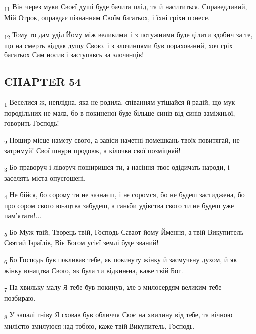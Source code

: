 \begin{tcolorbox}
\textsubscript{11} Він через муки Своєї душі буде бачити плід, та й насититься. Справедливий, Мій Отрок, оправдає пізнанням Своїм багатьох, і їхні гріхи понесе.
\end{tcolorbox}
\begin{tcolorbox}
\textsubscript{12} Тому то дам уділ Йому між великими, і з потужними буде ділити здобич за те, що на смерть віддав душу Свою, і з злочинцями був порахований, хоч гріх багатьох Сам носив і заступавсь за злочинців!
\end{tcolorbox}
\subsection{CHAPTER 54}
\begin{tcolorbox}
\textsubscript{1} Веселися ж, неплідна, яка не родила, співанням утішайся й радій, що мук породільних не мала, бо в покиненої буде більше синів від синів заміжньої, говорить Господь!
\end{tcolorbox}
\begin{tcolorbox}
\textsubscript{2} Пошир місце намету свого, а завіси наметні помешкань твоїх повитягай, не затримуй! Свої шнури продовж, а кілочки свої позміцняй!
\end{tcolorbox}
\begin{tcolorbox}
\textsubscript{3} Бо праворуч і ліворуч поширишся ти, а насіння твоє одідичать народи, і заселять міста опустошені.
\end{tcolorbox}
\begin{tcolorbox}
\textsubscript{4} Не бійся, бо сорому ти не зазнаєш, і не соромся, бо не будеш застиджена, бо про сором свого юнацтва забудеш, а ганьби удівства свого ти не будеш уже пам'ятати!...
\end{tcolorbox}
\begin{tcolorbox}
\textsubscript{5} Бо Муж твій, Творець твій, Господь Саваот йому Ймення, а твій Викупитель Святий Ізраїлів, Він Богом усієї землі буде званий!
\end{tcolorbox}
\begin{tcolorbox}
\textsubscript{6} Бо Господь був покликав тебе, як покинуту жінку й засмучену духом, й як жінку юнацтва Свого, як була ти відкинена, каже твій Бог.
\end{tcolorbox}
\begin{tcolorbox}
\textsubscript{7} На хвильку малу Я тебе був покинув, але з милосердям великим тебе позбираю.
\end{tcolorbox}
\begin{tcolorbox}
\textsubscript{8} У запалі гніву Я сховав був обличчя Своє на хвилину від тебе, та вічною милістю змилуюся над тобою, каже твій Викупитель, Господь.
\end{tcolorbox}
